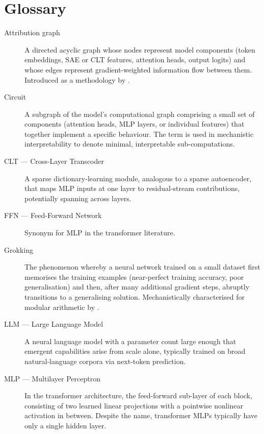 \chapter*{Glossary}

\begin{description}

  \item[Attribution graph] A directed acyclic graph whose nodes represent model components
    (token embeddings, SAE or CLT features, attention heads, output logits) and whose edges
    represent gradient-weighted information flow between them.
    Introduced as a methodology by \citet{lindsey2025biology}.

  \item[Circuit] A subgraph of the model's computational graph comprising a small set of
    components (attention heads, MLP layers, or individual features) that together implement a
    specific behaviour.
    The term is used in mechanistic interpretability to denote minimal, interpretable
    sub-computations.

  \item[CLT --- Cross-Layer Transcoder] A sparse dictionary-learning module, analogous to a
    sparse autoencoder, that maps MLP inputs at one layer to residual-stream contributions,
    potentially spanning across layers.

  \item[FFN --- Feed-Forward Network] Synonym for MLP in the transformer literature.

  \item[Grokking] The phenomenon whereby a neural network trained on a small dataset first
    memorises the training examples (near-perfect training accuracy, poor generalisation) and
    then, after many additional gradient steps, abruptly transitions to a generalising solution.
    Mechanistically characterised for modular arithmetic by \citet{nanda2023progress}.

  \item[LLM --- Large Language Model] A neural language model with a parameter count
    large enough that emergent capabilities arise from scale alone, typically trained on
    broad natural-language corpora via next-token prediction.

  \item[MLP --- Multilayer Perceptron] In the transformer architecture, the feed-forward
    sub-layer of each block, consisting of two learned linear projections with a pointwise
    nonlinear activation in between.
    Despite the name, transformer MLPs typically have only a single hidden layer.


\end{description}
